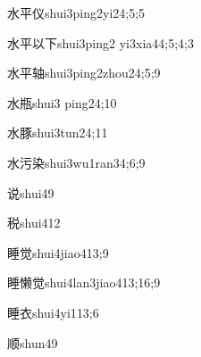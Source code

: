 \begin{verbete}{水平仪}{shui3ping2yi2}{4;5;5}
\end{verbete}

\begin{verbete}{水平以下}{shui3ping2 yi3xia4}{4;5;4;3}
\end{verbete}

\begin{verbete}{水平轴}{shui3ping2zhou2}{4;5;9}
\end{verbete}

\begin{verbete}{水瓶}{shui3 ping2}{4;10}
\end{verbete}

\begin{verbete}{水豚}{shui3tun2}{4;11}
\end{verbete}

\begin{verbete}{水污染}{shui3wu1ran3}{4;6;9}
\end{verbete}

\begin{verbete}{说}{shui4}{9}
\end{verbete}

\begin{verbete}{税}{shui4}{12}
\end{verbete}

\begin{verbete}{睡觉}{shui4jiao4}{13;9}
\end{verbete}

\begin{verbete}{睡懒觉}{shui4lan3jiao4}{13;16;9}
\end{verbete}

\begin{verbete}{睡衣}{shui4yi1}{13;6}
\end{verbete}

\begin{verbete}{顺}{shun4}{9}
\end{verbete}

